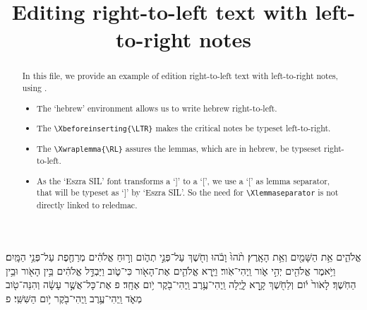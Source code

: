 \documentclass[12pt]{article}
\title{Editing right-to-left text with left-to-right notes}
\date{}
\begin{document}
\begin{abstract}

\maketitle
In this file, we provide an example of edition right-to-left text with left-to-right notes, using \XeLaTeX.

\begin{itemize}
	\item The `hebrew' environment allows us to write hebrew right-to-left.
	\item The \verb+\Xbeforeinserting{\LTR}+  makes the critical notes be typeset left-to-right.
	\item The \verb+\Xwraplemma{\RL}+ assures the lemmas, which are in hebrew, be typseset right-to-left.
	\item As the `Eszra SIL' font transforms a `]' to a `[', we use a `[' as lemma separator, that will be typeset as `]' by `Eszra SIL'. So the need for \verb+\Xlemmaseparator+ is not directly linked to reledmac.
\end{itemize}

\end{abstract}

\begin{hebrew}
\beginnumbering


\pstart
{} 
אֱלֹהִ֑ים אֵ֥ת הַשָּׁמַ֖יִם וְאֵ֥ת הָאָֽרֶץ׃
 תֹ֨הוּ֙ וָבֹ֔הוּ וְחֹ֖שֶׁךְ עַל־פְּנֵ֣י תְהֹ֑ום וְר֣וּחַ אֱלֹהִ֔ים מְרַחֶ֖פֶת עַל־פְּנֵ֥י הַמָּֽיִם׃
וַיֹּ֥אמֶר אֱלֹהִ֖ים יְהִ֣י אֹ֑ור וַֽיְהִי־אֹֽור׃
וַיַּ֧רְא אֱלֹהִ֛ים אֶת־הָאֹ֖ור כִּי־טֹ֑וב וַיַּבְדֵּ֣ל אֱלֹהִ֔ים בֵּ֥ין הָאֹ֖ור וּבֵ֥ין הַחֹֽשֶׁךְ׃
 לָאֹור֙ יֹ֔ום וְלַחֹ֖שֶׁךְ קָ֣רָא לָ֑יְלָה וַֽיְהִי־עֶ֥רֶב וַֽיְהִי־בֹ֖קֶר יֹ֥ום אֶחָֽד׃ פ
 אֶת־כָּל־אֲשֶׁ֣ר עָשָׂ֔ה וְהִנֵּה־טֹ֖וב מְאֹ֑ד וַֽיְהִי־עֶ֥רֶב וַֽיְהִי־בֹ֖קֶר יֹ֥ום הַשִּׁשִּֽׁי׃ פ

\pend
\endnumbering

\end{hebrew}
\end{document}
